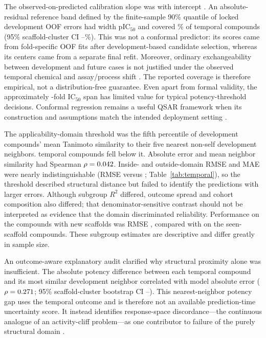 \documentclass[11pt]{article}
\begin{document}
The observed-on-predicted calibration slope was \CalibrationSlope{} with
intercept \CalibrationIntercept{}. An absolute-residual reference band defined
by the finite-sample 90\% quantile of locked development OOF errors had width
\IntervalWidth{} pIC$_{50}$ and covered \TemporalCoveragePercent{}\% of temporal
compounds (95\% scaffold-cluster CI
\CoverageLowerPercent{}--\CoverageUpperPercent{}\%). This was not a conformal
predictor: its scores came from fold-specific OOF fits after development-based
candidate selection, whereas its centers came from a separate final refit.
Moreover, ordinary exchangeability between development and future cases is not
justified under the observed temporal chemical and assay/process shift
\citep{tibshirani2019covariate,barber2023beyond}. The reported coverage is
therefore empirical, not a distribution-free guarantee. Even apart from formal
validity, the approximately \IntervalFoldSpan{}-fold IC$_{50}$ span has limited
value for typical potency-threshold decisions. Conformal regression remains a
useful QSAR framework when its construction and assumptions match the intended
deployment setting \citep{svensson2018conformal}.

The applicability-domain threshold was the fifth percentile of development
compounds' mean Tanimoto similarity to their five nearest non-self development
neighbors. \OutsideADCount{} temporal compounds fell below it. Absolute error
and mean neighbor similarity had Spearman $\rho=0.042{}$.
Inside- and outside-domain RMSE and MAE were nearly indistinguishable
(RMSE \InsideADRMSE{} versus \OutsideADRMSE{}; Table~\ref{tab:temporal}), so the threshold described structural distance but
failed to identify the predictions with larger errors. Although subgroup $R^2$
differed, outcome spread and cohort composition also differed; that
denominator-sensitive contrast should not be interpreted as evidence that the
domain discriminated reliability.
Performance on the \NewTemporalCompoundCount{} compounds with new scaffolds was
RMSE \NewScaffoldRMSE{}, compared with \SeenScaffoldRMSE{} on the
\SeenTemporalCompoundCount{} seen-scaffold compounds. These subgroup estimates
are descriptive and differ greatly in sample size.

An outcome-aware explanatory audit clarified why structural proximity alone was
insufficient. The absolute potency difference between each temporal compound and
its most similar development neighbor correlated with model absolute error
($\rho=0.271{}$; 95\% scaffold-cluster bootstrap CI
\NearestNeighborGapErrorLower{}--\NearestNeighborGapErrorUpper{}). This
nearest-neighbor potency gap uses the temporal outcome and is therefore not an
available prediction-time uncertainty score. It instead identifies response-space
discordance---the continuous analogue of an activity-cliff problem---as one
contributor to failure of the purely structural domain
\citep{vantilborg2022cliffs}.
\end{document}
